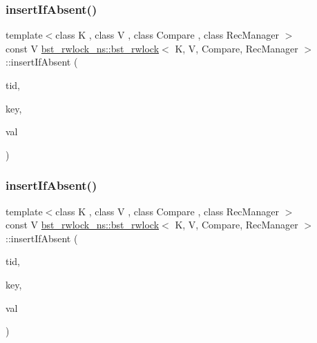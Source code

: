 \subsubsection{\texorpdfstring{insert\+If\+Absent()}{insertIfAbsent()}\hspace{0.1cm}{\footnotesize\ttfamily [1/2]}}
{\footnotesize\ttfamily template$<$class K , class V , class Compare , class Rec\+Manager $>$ \\
const V \hyperlink{classbst__rwlock__ns_1_1bst__rwlock}{bst\+\_\+rwlock\+\_\+ns\+::bst\+\_\+rwlock}$<$ K, V, Compare, Rec\+Manager $>$\+::insert\+If\+Absent (\begin{DoxyParamCaption}\item[{const int}]{tid,  }\item[{const K \&}]{key,  }\item[{const V \&}]{val }\end{DoxyParamCaption})\hspace{0.3cm}{\ttfamily [inline]}}

\mbox{\label{classbst__rwlock__ns_1_1bst__rwlock_a1b1924a1c36bf81b71fe7c9ccb89ef9b}} 
\subsubsection{\texorpdfstring{insert\+If\+Absent()}{insertIfAbsent()}\hspace{0.1cm}{\footnotesize\ttfamily [2/2]}}
{\footnotesize\ttfamily template$<$class K , class V , class Compare , class Rec\+Manager $>$ \\
const V \hyperlink{classbst__rwlock__ns_1_1bst__rwlock}{bst\+\_\+rwlock\+\_\+ns\+::bst\+\_\+rwlock}$<$ K, V, Compare, Rec\+Manager $>$\+::insert\+If\+Absent (\begin{DoxyParamCaption}\item[{const int}]{tid,  }\item[{const K \&}]{key,  }\item[{const V \&}]{val }\end{DoxyParamCaption})\hspace{0.3cm}{\ttfamily [inline]}}

\mbox{\label{classbst__rwlock__ns_1_1bst__rwlock_a6ae6dae5dfb3dc230566bb5be9b9196b}} 
